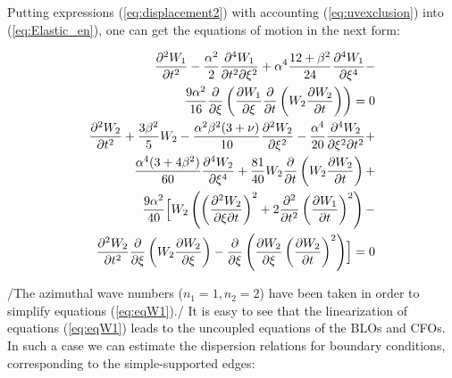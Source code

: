 
Putting  expressions (\ref{eq:displacement2}) with accounting (\ref{eq:uvexclusion}) into (\ref{eq:Elastic_en}), one can get the equations of motion in the next form:

\begin{eqnarray}\label{eq:eqW1}
\frac{\partial^{2} W_{1}}{\partial t^{2}}   -\frac{\alpha^2}{2} \frac{\partial^{4} W_{1}}{\partial t^{2} \partial \xi^{2}}+\alpha^{4} \frac{12+\beta^{2}}{24} \frac{\partial^{4} W_{1}}{\partial \xi^{4}}- \nonumber  \\\frac{9 \alpha^2}{16} \frac{\partial }{\partial \xi} \left( \frac{\partial W_{1}}{\partial \xi} \frac{\partial }{\partial t} \left( W_{2} \frac{\partial W_{2}}{\partial t} \right) \right) =0 \nonumber  \\
\frac{\partial^{2} W_{2}}{\partial t^{2}}   +\frac{3 \beta^{2}}{5} W_{2} - \frac{\alpha^2 \beta^{2} (3+\nu)}{10} \frac{\partial^2 W_{2}}{\partial \xi^2}-\frac{\alpha^4}{20} \frac{\partial ^{4} W_{2}}{\partial \xi^{2} \partial t^2}+  \nonumber  \\  \frac{\alpha^{4} (3+4\beta^2)}{60}\frac{\partial ^{4} W_{2}}{\partial \xi^{4}} + 
\frac{81}{40}W_{2}    \frac{\partial }{\partial t} \left( W_{2} \frac{\partial W_{2}}{\partial t} \right)+   \nonumber  \\  \frac{9 \alpha^{2}}{40} \Bigl[ W_{2} \left( \left(\frac{\partial ^2 W_{2}}{\partial \xi \partial t} \right) ^{2} +2 \frac{\partial^2}{\partial t^2} \left( \frac{\partial W_{1}}{\partial t} \right)^2   \right)  -   \nonumber  \\   
\frac{\partial^2 W_{2}}{\partial t^2}   \frac{\partial}{\partial \xi} \left( W_2 \frac{\partial W_{2}}{\partial \xi} \right) -\frac{\partial }{\partial \xi} \left( \frac{\partial W_{2}}{\partial \xi} \left(\frac{\partial W_{2}}{\partial t} \right)^2 \right)   \Bigr] =0
\end{eqnarray}

/The azimuthal wave numbers ($n_1=1, n_2 =2$) have been taken in order to simplify equations (\ref{eq:eqW1})./
It is easy to see that the linearization of equations (\ref{eq:eqW1}) leads to the uncoupled equations of the BLOs and CFOs.
In such a case we can estimate the dispersion relations for boundary conditions, corresponding to the simple-supported edges:

